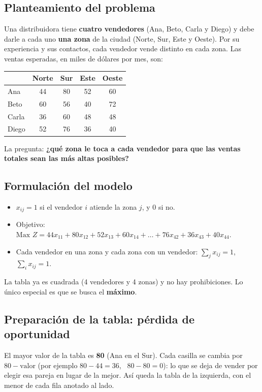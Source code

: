 \documentclass[11pt,a4paper]{article}
\begin{document}
\subsection*{Planteamiento del problema}
Una distribuidora tiene \textbf{cuatro vendedores} (Ana, Beto, Carla y Diego) y debe darle a cada uno
\textbf{una zona} de la ciudad (Norte, Sur, Este y Oeste). Por su experiencia y sus contactos, cada vendedor vende
distinto en cada zona. Las ventas esperadas, en miles de dólares por mes, son:

\begin{center}
\begin{tabular}{lcccc}
\toprule
 & \textbf{Norte} & \textbf{Sur} & \textbf{Este} & \textbf{Oeste} \\
\midrule
Ana   & 44 & 80 & 52 & 60 \\
Beto  & 60 & 56 & 40 & 72 \\
Carla & 36 & 60 & 48 & 48 \\
Diego & 52 & 76 & 36 & 40 \\
\bottomrule
\end{tabular}
\end{center}

La pregunta: \textbf{¿qué zona le toca a cada vendedor para que las ventas totales sean las más altas posibles?}

\subsection*{Formulación del modelo}
\begin{itemize}[itemsep=2pt]
  \item $x_{ij} = 1$ si el vendedor $i$ atiende la zona $j$, y 0 si no.
  \item Objetivo: $\text{Max } Z = 44x_{11} + 80x_{12} + 52x_{13} + 60x_{14} + \dots + 76x_{42} + 36x_{43} + 40x_{44}$.
  \item Cada vendedor en una zona y cada zona con un vendedor: $\sum_j x_{ij} = 1$, \ $\sum_i x_{ij} = 1$.
\end{itemize}
La tabla ya es cuadrada (4 vendedores y 4 zonas) y no hay prohibiciones. Lo único especial es que se busca el
\textbf{máximo}.

\subsection*{Preparación de la tabla: pérdida de oportunidad}
El mayor valor de la tabla es \textbf{80} (Ana en el Sur). Cada casilla se cambia por $80 - \text{valor}$
(por ejemplo $80 - 44 = 36$, \ $80 - 80 = 0$): lo que se deja de vender por elegir esa pareja en lugar de la mejor.
Así queda la tabla de la izquierda, con el menor de cada fila anotado al lado.
\end{document}
